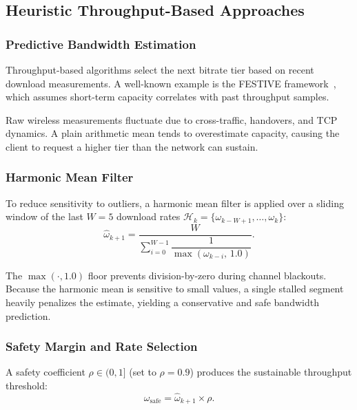 \documentclass[conference]{IEEEtran}
\begin{document}
\subsection{Heuristic Throughput-Based Approaches}

\subsubsection{Predictive Bandwidth Estimation}

Throughput-based algorithms select the next bitrate tier based on recent
download measurements.  A well-known example is the FESTIVE
framework~\cite{jiang2012}, which assumes short-term capacity correlates
with past throughput samples.

Raw wireless measurements fluctuate due to cross-traffic, handovers, and
TCP dynamics.  A plain arithmetic mean tends to overestimate capacity,
causing the client to request a higher tier than the network can sustain.

\subsubsection{Harmonic Mean Filter}

To reduce sensitivity to outliers, a harmonic mean filter is applied over
a sliding window of the last $W=5$ download rates
$\mathcal{H}_k=\{\omega_{k-W+1},\dots,\omega_k\}$:
\begin{equation}
  \hat{\omega}_{k+1}=\frac{W}{\displaystyle\sum_{i=0}^{W-1}
    \dfrac{1}{\max(\omega_{k-i},\,1.0)}}.
  \label{eq:harmonic_mean}
\end{equation}

The $\max(\cdot,1.0)$ floor prevents division-by-zero during channel
blackouts.  Because the harmonic mean is sensitive to small values, a single
stalled segment heavily penalizes the estimate, yielding a conservative and
safe bandwidth prediction.

\subsubsection{Safety Margin and Rate Selection}

A safety coefficient $\rho\in(0,1]$ (set to $\rho=0.9$) produces the
sustainable throughput threshold:
\begin{equation}
  \omega_{\text{safe}}=\hat{\omega}_{k+1}\times\rho.
  \label{eq:safe_throughput}
\end{equation}
\end{document}
